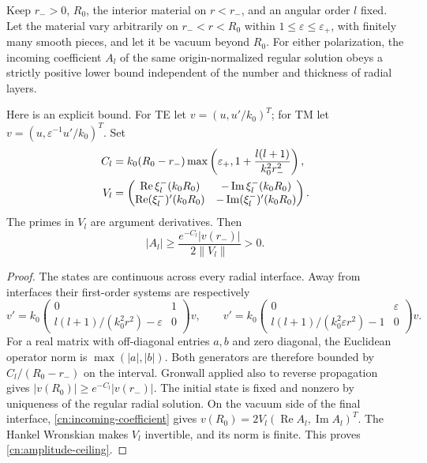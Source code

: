 \begin{proposition}
\label{cn:fixed-control-ceiling}
Keep $r_->0$, $R_0$, the interior material on $r<r_-$, and an angular
order $l$ fixed.  Let the material vary arbitrarily on
$r_-<r<R_0$ within $1\leq\varepsilon\leq\varepsilon_+$,
with finitely many smooth pieces, and let it be vacuum beyond $R_0$.
For either polarization, the incoming coefficient $A_l$ of the same
origin-normalized regular solution obeys a strictly positive lower
bound independent of the number and thickness of radial layers.

Here is an explicit bound.  For TE let
$v=(u,u'/k_0)^T$; for TM let
$v=(u,\varepsilon^{-1}u'/k_0)^T$.  Set
\begin{align}
 C_l&=k_0(R_0-r_-)
       \max\left(\varepsilon_+,
               1+\frac{l(l+1)}{k_0^2r_-^2}\right),\notag\\
 V_l&=\begin{pmatrix}
 \operatorname{Re}\xi_l^-(k_0R_0)&
             -\operatorname{Im}\xi_l^-(k_0R_0)\\
 \operatorname{Re}(\xi_l^-)'(k_0R_0)&
             -\operatorname{Im}(\xi_l^-)'(k_0R_0)
 \end{pmatrix}.
 \label{cn:ceiling-data}
\end{align}
The primes in $V_l$ are argument derivatives.  Then
\begin{equation}\label{cn:amplitude-ceiling}
 |A_l|\geq
       \frac{e^{-C_l}|v(r_-)|}{2\|V_l\|}>0.
\end{equation}
\end{proposition}
\begin{proof}
The states are continuous across every radial interface.  Away from
interfaces their first-order systems are respectively
\begin{equation}\label{cn:state-generators}
 v'=k_0\begin{pmatrix}0&1\\
 l(l+1)/(k_0^2r^2)-\varepsilon&0\end{pmatrix}v,
 \qquad
 v'=k_0\begin{pmatrix}0&\varepsilon\\
 l(l+1)/(k_0^2\varepsilon r^2)-1&0\end{pmatrix}v.
\end{equation}
For a real matrix with off-diagonal entries $a,b$ and zero diagonal,
the Euclidean operator norm is $\max(|a|,|b|)$.  Both generators
are therefore bounded by $C_l/(R_0-r_-)$ on the interval.
Gronwall applied also to reverse propagation gives
$|v(R_0)|\geq e^{-C_l}|v(r_-)|$.
The initial state is fixed and nonzero by uniqueness of the regular
radial solution.  On the vacuum side of the final interface,
\eqref{cn:incoming-coefficient} gives
$v(R_0)=2V_l(\operatorname{Re}A_l,\operatorname{Im}A_l)^T$.
The Hankel Wronskian makes $V_l$ invertible, and its norm is finite.
This proves \eqref{cn:amplitude-ceiling}.
\end{proof}

